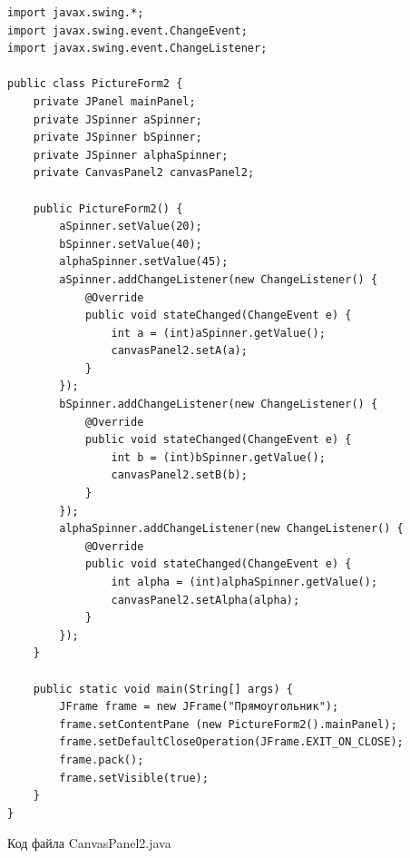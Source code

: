 \documentclass[a4paper, 14pt]{extarticle}
\begin{document}
\begin{lstlisting}
import javax.swing.*;
import javax.swing.event.ChangeEvent;
import javax.swing.event.ChangeListener;

public class PictureForm2 {
    private JPanel mainPanel;
    private JSpinner aSpinner;
    private JSpinner bSpinner;
    private JSpinner alphaSpinner;
    private CanvasPanel2 canvasPanel2;

    public PictureForm2() {
        aSpinner.setValue(20);
        bSpinner.setValue(40);
        alphaSpinner.setValue(45);
        aSpinner.addChangeListener(new ChangeListener() {
            @Override
            public void stateChanged(ChangeEvent e) {
                int a = (int)aSpinner.getValue();
                canvasPanel2.setA(a);
            }
        });
        bSpinner.addChangeListener(new ChangeListener() {
            @Override
            public void stateChanged(ChangeEvent e) {
                int b = (int)bSpinner.getValue();
                canvasPanel2.setB(b);
            }
        });
        alphaSpinner.addChangeListener(new ChangeListener() {
            @Override
            public void stateChanged(ChangeEvent e) {
                int alpha = (int)alphaSpinner.getValue();
                canvasPanel2.setAlpha(alpha);
            }
        });
    }

    public static void main(String[] args) {
        JFrame frame = new JFrame("Прямоугольник");
        frame.setContentPane (new PictureForm2().mainPanel);
        frame.setDefaultCloseOperation(JFrame.EXIT_ON_CLOSE);
        frame.pack();
        frame.setVisible(true);
    }
}
\end{lstlisting}
\par
Код файла CanvasPanel2.java
\end{document}
